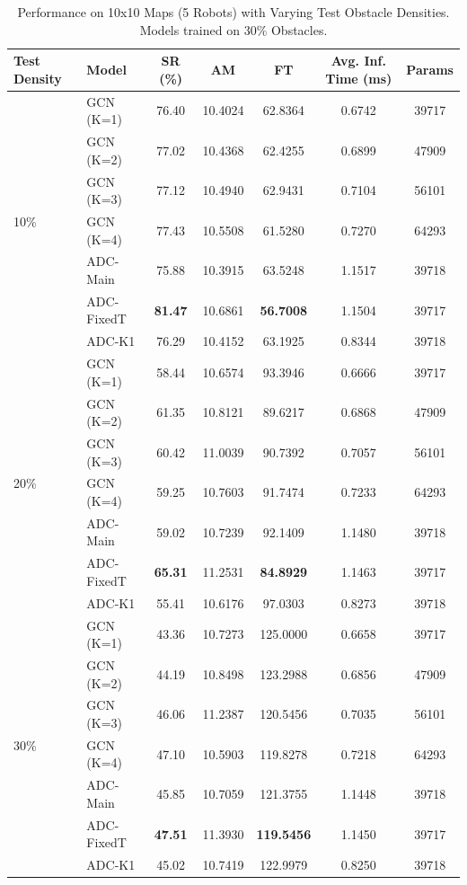 \begin{table}[htbp]
    \centering
    \caption{Performance on 10x10 Maps (5 Robots) with Varying Test Obstacle Densities. Models trained on 30\% Obstacles.}
    \label{tab:density_perf_30D_train}
    \scriptsize %
    \begin{tabular}{llccccc}
        \toprule
        Test Density & Model & SR (\%) & AM & FT & Avg. Inf. Time (ms) & Params \\
        \midrule
        \multirow{7}{*}{10\%}
        & GCN (K=1) & 76.40 & 10.4024 & 62.8364 & 0.6742 & 39717 \\
        & GCN (K=2) & 77.02 & 10.4368 & 62.4255 & 0.6899 & 47909 \\
        & GCN (K=3) & 77.12 & 10.4940 & 62.9431 & 0.7104 & 56101 \\
        & GCN (K=4) & 77.43 & 10.5508 & 61.5280 & 0.7270 & 64293 \\
        & ADC-Main & 75.88 & 10.3915 & 63.5248 & 1.1517 & 39718 \\
        & ADC-FixedT & \textbf{81.47} & 10.6861 & \textbf{56.7008} & 1.1504 & 39717 \\
        & ADC-K1 & 76.29 & 10.4152 & 63.1925 & 0.8344 & 39718 \\
        \midrule
        \multirow{7}{*}{20\%}
        & GCN (K=1) & 58.44 & 10.6574 & 93.3946 & 0.6666 & 39717 \\
        & GCN (K=2) & 61.35 & 10.8121 & 89.6217 & 0.6868 & 47909 \\
        & GCN (K=3) & 60.42 & 11.0039 & 90.7392 & 0.7057 & 56101 \\
        & GCN (K=4) & 59.25 & 10.7603 & 91.7474 & 0.7233 & 64293 \\
        & ADC-Main & 59.02 & 10.7239 & 92.1409 & 1.1480 & 39718 \\
        & ADC-FixedT & \textbf{65.31} & 11.2531 & \textbf{84.8929} & 1.1463 & 39717 \\ 
        & ADC-K1 & 55.41 & 10.6176 & 97.0303 & 0.8273 & 39718 \\
        \midrule
        \multirow{7}{*}{30\%}
        & GCN (K=1) & 43.36 & 10.7273 & 125.0000 & 0.6658 & 39717 \\
        & GCN (K=2) & 44.19 & 10.8498 & 123.2988 & 0.6856 & 47909 \\
        & GCN (K=3) & 46.06 & 11.2387 & 120.5456 & 0.7035 & 56101 \\
        & GCN (K=4) & 47.10 & 10.5903 & 119.8278 & 0.7218 & 64293 \\
        & ADC-Main & 45.85 & 10.7059 & 121.3755 & 1.1448 & 39718 \\
        & ADC-FixedT & \textbf{47.51} & 11.3930 & \textbf{119.5456} & 1.1450 & 39717 \\
        & ADC-K1 & 45.02 & 10.7419 & 122.9979 & 0.8250 & 39718 \\
        \bottomrule
    \end{tabular}
\end{table}
